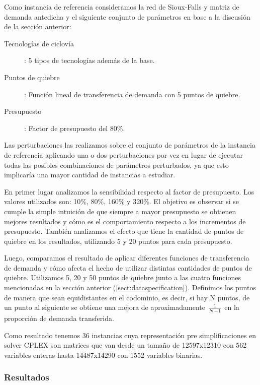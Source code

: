 \documentclass{article}
\begin{document}
  Como instancia de referencia consideramos la red de Sioux-Falls y matriz de demanda antedicha y el siguiente conjunto de parámetros en base a la discusión de la sección anterior:

  \begin{description}
    \item[Tecnologías de ciclovía]: 5 tipos de tecnologías además de la base.
    \item[Puntos de quiebre]: Función lineal de transferencia de demanda con 5 puntos de quiebre.
    \item[Presupuesto]: Factor de presupuesto del 80\%.
  \end{description}

  Las perturbaciones las realizamos sobre el conjunto de parámetros de la instancia de referencia aplicando una o dos perturbaciones por vez en lugar de ejecutar todas las posibles combinaciones de parámetros perturbados, ya que esto implicaría una mayor cantidad de instancias a estudiar.

  En primer lugar analizamos la sensibilidad respecto al factor de presupuesto. Los valores utilizados son: 10\%, 80\%, 160\% y 320\%. El objetivo es observar si se cumple la simple intuición de que siempre a mayor presupuesto se obtienen mejores resultados y cómo es el comportamiento respecto a los incrementos de presupuesto. También analizamos el efecto que tiene la cantidad de puntos de quiebre en los resultados, utilizando 5 y 20 puntos para cada presupuesto.

  Luego, comparamos el resultado de aplicar diferentes funciones de transferencia de demanda y cómo afecta el hecho de utilizar distintas cantidades de puntos de quiebre. Utilizamos 5, 20 y 50 puntos de quiebre junto a las cuatro funciones mencionadas en la sección anterior (\ref{sect:dataspecification}). Definimos los puntos de manera que sean equidistantes en el codominio, es decir, si hay N puntos, de un punto al siguiente se obtiene una mejora de aproximadamente ${1 \over N - 1}$ en la proporción de demanda transferida.

  Como resultado tenemos 36 instancias cuya representación pre simplificaciones en solver CPLEX son matrices que van desde un tamaño de 12597x12310 con 562 variables enteras hasta 14487x14290 con 1552 variables binarias.

  \FloatBarrier
  \subsubsection{Resultados}
\end{document}
